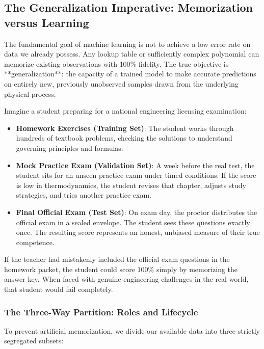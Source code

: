 \subsection{The Generalization Imperative: Memorization versus Learning}\label{subsec:generalization_imperative}

The fundamental goal of machine learning is not to achieve a low error rate on data we already possess. Any lookup table or sufficiently complex polynomial can memorize existing observations with $100\%$ fidelity. The true objective is **generalization**: the capacity of a trained model to make accurate predictions on entirely new, previously unobserved samples drawn from the underlying physical process.

\begin{analogy}
Imagine a student preparing for a national engineering licensing examination:
\begin{itemize}
    \item \textbf{Homework Exercises (Training Set)}: The student works through hundreds of textbook problems, checking the solutions to understand governing principles and formulas.
    \item \textbf{Mock Practice Exam (Validation Set)}: A week before the real test, the student sits for an unseen practice exam under timed conditions. If the score is low in thermodynamics, the student revises that chapter, adjusts study strategies, and tries another practice exam.
    \item \textbf{Final Official Exam (Test Set)}: On exam day, the proctor distributes the official exam in a sealed envelope. The student sees these questions exactly once. The resulting score represents an honest, unbiased measure of their true competence.
\end{itemize}
If the teacher had mistakenly included the official exam questions in the homework packet, the student could score $100\%$ simply by memorizing the answer key. When faced with genuine engineering challenges in the real world, that student would fail completely.
\end{analogy}

\subsubsection{The Three-Way Partition: Roles and Lifecycle}
To prevent artificial memorization, we divide our available data into three strictly segregated subsets:

